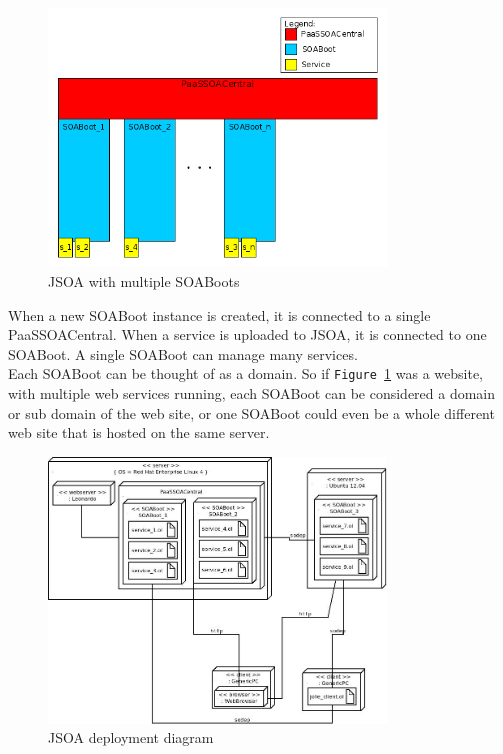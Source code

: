 \documentclass[12pt,a4paper]{article}
\begin{document}
\begin{figure}[h!]
  \centering
    \includegraphics[width=0.8\textwidth]{../figures/jsoa_multiple_soaboot.png}
  \caption{JSOA with multiple SOABoots}
  \label{fig:jsoaMultipleSOABoots}
\end{figure}

When a new SOABoot instance is created, it is connected to a single PaaSSOACentral. When a service is uploaded to JSOA, it is connected to one SOABoot. A single SOABoot can manage many services.\\
Each SOABoot can be thought of as a domain. So if \texttt{Figure \ref{fig:jsoaMultipleSOABoots}} was a website, with multiple web services running, each SOABoot can be considered a domain or sub domain of the web site, or one SOABoot could even be a whole different web site that is hosted on the same server.

\newpage
\begin{figure}[h!]
  \centering
    \includegraphics[width=0.8\textwidth]{../figures/jsoa_deployment_diagram.jpeg}
  \caption{JSOA deployment diagram}
  \label{fig:jsoaDeploymentDiagram}
\end{figure}
\end{document}

